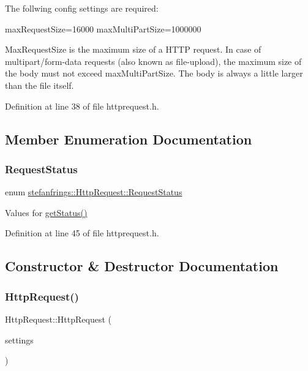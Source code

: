The follwing config settings are required\+: {\ttfamily 
\begin{DoxyPre}
maxRequestSize=16000
maxMultiPartSize=1000000
\end{DoxyPre}
} 

Max\+Request\+Size is the maximum size of a H\+T\+TP request. In case of multipart/form-\/data requests (also known as file-\/upload), the maximum size of the body must not exceed max\+Multi\+Part\+Size. The body is always a little larger than the file itself. 

Definition at line 38 of file httprequest.\+h.



\subsection{Member Enumeration Documentation}
\mbox{\label{classstefanfrings_1_1_http_request_a45b0d7b99dbbb1b2c62afd8f51887995}} 
\subsubsection{\texorpdfstring{Request\+Status}{RequestStatus}}
{\footnotesize\ttfamily enum \mbox{\hyperlink{classstefanfrings_1_1_http_request_a45b0d7b99dbbb1b2c62afd8f51887995}{stefanfrings\+::\+Http\+Request\+::\+Request\+Status}}}

Values for \mbox{\hyperlink{classstefanfrings_1_1_http_request_a1e53a0d5566400eae00e47b819a26c30}{get\+Status()}} 

Definition at line 45 of file httprequest.\+h.



\subsection{Constructor \& Destructor Documentation}
\mbox{\label{classstefanfrings_1_1_http_request_a948b749ba225459dad7514630897cca8}} 
\subsubsection{\texorpdfstring{Http\+Request()}{HttpRequest()}}
{\footnotesize\ttfamily Http\+Request\+::\+Http\+Request (\begin{DoxyParamCaption}\item[{Q\+Settings $\ast$}]{settings }\end{DoxyParamCaption})}

